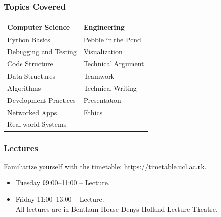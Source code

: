 \documentclass{beamer} %
\begin{document}
\begin{frame}
\frametitle{Topics Covered} 

\begin{center}
\begin{tabular}{ l l }
  \hline
  Computer Science & Engineering \\
  \hline
  Python Basics & Pebble in the Pond\\
  Debugging and Testing & Visualization\\
  Code Structure & Technical Argument\\
  Data Structures & Teamwork \\
  Algorithms & Technical Writing\\
  Development Practices & Presentation\\
  Networked Apps & Ethics\\
  Real-world Systems\\
  \hline
\end{tabular}
\end{center}

\end{frame}

\begin{frame}
\frametitle{Lectures} 

Familiarize yourself with the timetable: \url{https://timetable.ucl.ac.uk}.

\begin{itemize}
\item Tuesday 09:00--11:00 -- Lecture.\\
\item Friday 11:00--13:00 -- Lecture.\\
All lectures are in Bentham House Denys Holland Lecture Theatre.
\end{itemize}
\end{frame}
\end{document}
